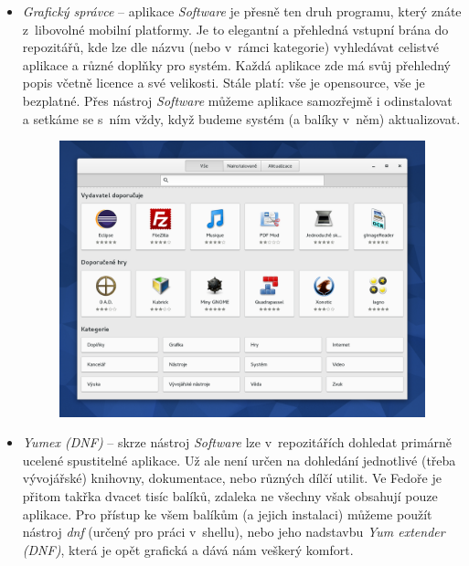 \begin{itemize}
\item \emph{Grafický správce} -- aplikace \emph{Software} je přesně ten druh programu, který znáte z~libovolné mobilní platformy. Je to elegantní a přehledná vstupní brána do repozitářů, kde lze dle názvu (nebo v~rámci kategorie) vyhledávat celistvé aplikace a různé doplňky pro systém. Každá aplikace zde má svůj přehledný popis včetně licence a své velikosti. Stále platí: vše je opensource, vše je bezplatné. Přes nástroj \emph{Software} můžeme aplikace samozřejmě i odinstalovat a setkáme se s~ním vždy, když budeme systém (a balíky v~něm) aktualizovat.

\begin{figure}[t]
\begin{center}
\includegraphics[width=\textwidth]{img/software}
 \label{fig:software}
\end{center}
\end{figure}

\item \emph{Yumex (DNF)} -- skrze nástroj \emph{Software} lze v~repozitářích dohledat primárně ucelené spustitelné aplikace. Už ale není určen na dohledání jednotlivé (třeba vývojářské) knihovny, dokumentace, nebo různých dílčí utilit. Ve Fedoře je přitom takřka dvacet tisíc balíků, zdaleka ne všechny však obsahují pouze aplikace. Pro přístup ke všem balíkům (a jejich instalaci) můžeme použít nástroj \emph{dnf} (určený pro práci v~shellu), nebo jeho nadstavbu \emph{Yum extender (DNF)}, která je opět grafická a dává nám veškerý komfort.
\end{itemize}

